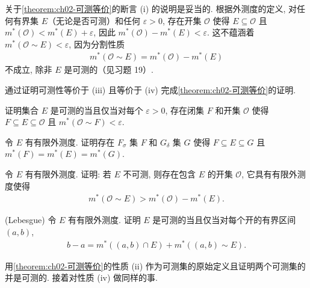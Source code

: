 \documentclass[../../main.tex]{subfiles}
\begin{document}
\begin{remark}
关于\cref{theorem:ch02-可测等价}的断言 (i) 的说明是妥当的. 根据外测度的定义, 对任何有界集 $E$（无论是否可测）和任何 $\varepsilon>0$, 存在开集 $\mathcal{O}$ 使得 $E\subseteq\mathcal{O}$ 且 $m^{*}(\mathcal{O})<m^{*}(E)+\varepsilon$, 因此 $m^{*}(\mathcal{O})-m^{*}(E)<\varepsilon$. 这不蕴涵着 $m^{*}(\mathcal{O}\sim E)<\varepsilon$, 因为分割性质
\begin{align*}
m^{*}(\mathcal{O}\sim E)=m^{*}(\mathcal{O})-m^{*}(E)
\end{align*}
不成立, 除非 $E$ 是可测的（见习题 19）.
\end{remark}

\begin{exercise}\label{exercise:ch02-16}
通过证明可测性等价于 (iii) 且等价于 (iv) 完成\cref{theorem:ch02-可测等价}的证明.
\end{exercise}

\begin{exercise}\label{exercise:ch02-17}
证明集合 $E$ 是可测的当且仅当对每个 $\varepsilon>0$, 存在闭集 $F$ 和开集 $\mathcal{O}$ 使得 $F\subseteq E\subseteq\mathcal{O}$ 且 $m^{*}(\mathcal{O}\sim F)<\varepsilon$.
\end{exercise}

\begin{exercise}\label{exercise:ch02-18}
令 $E$ 有有限外测度. 证明存在 $F_{\sigma}$ 集 $F$ 和 $G_{\delta}$ 集 $G$ 使得 $F\subseteq E\subseteq G$ 且 $m^{*}(F)=m^{*}(E)=m^{*}(G)$.
\end{exercise}

\begin{exercise}\label{exercise:ch02-19}
令 $E$ 有有限外测度. 证明: 若 $E$ 不可测, 则存在包含 $E$ 的开集 $\mathcal{O}$, 它具有有限外测度使得
\begin{align*}
m^{*}(\mathcal{O}\sim E)>m^{*}(\mathcal{O})-m^{*}(E).
\end{align*}
\end{exercise}

\begin{exercise}\label{exercise:ch02-20}
(Lebesgue) 令 $E$ 有有限外测度. 证明 $E$ 是可测的当且仅当对每个开的有界区间 $(a,b)$,
\begin{align*}
b-a=m^{*}((a,b)\cap E)+m^{*}((a,b)\sim E).
\end{align*}
\end{exercise}

\begin{exercise}\label{exercise:ch02-21}
用\cref{theorem:ch02-可测等价}的性质 (ii) 作为可测集的原始定义且证明两个可测集的并是可测的. 接着对性质 (iv) 做同样的事.
\end{exercise}
\end{document}
